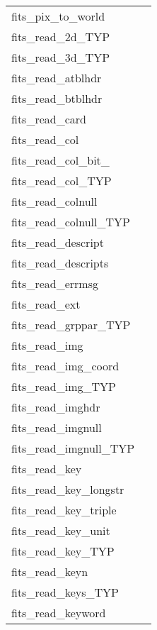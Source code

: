\documentclass[11pt]{book}
\begin{document}
\begin{tabular}{lr}
fits\_pix\_to\_world & \pageref{ffwldp} \\
fits\_read\_2d\_TYP      & \pageref{ffg2dx} \\
fits\_read\_3d\_TYP      & \pageref{ffg3dx} \\
fits\_read\_atblhdr      & \pageref{ffghtb} \\
fits\_read\_btblhdr      & \pageref{ffghbn} \\
fits\_read\_card         & \pageref{ffgcrd} \\
fits\_read\_col        & \pageref{ffgcv} \\
fits\_read\_col\_bit\_ & \pageref{ffgcx} \\
fits\_read\_col\_TYP    & \pageref{ffgcvx} \\
fits\_read\_colnull    & \pageref{ffgcf} \\
fits\_read\_colnull\_TYP    & \pageref{ffgcfx} \\
fits\_read\_descript & \pageref{ffgdes} \\
fits\_read\_descripts & \pageref{ffgdes} \\
fits\_read\_errmsg    & \pageref{ffgmsg} \\
fits\_read\_ext        & \pageref{ffgextn} \\
fits\_read\_grppar\_TYP  & \pageref{ffggpx} \\
fits\_read\_img         & \pageref{ffgpv} \\
fits\_read\_img\_coord & \pageref{ffgics} \\
fits\_read\_img\_TYP     & \pageref{ffgpvx} \\
fits\_read\_imghdr       & \pageref{ffghpr} \\
fits\_read\_imgnull & \pageref{ffgpf} \\
fits\_read\_imgnull\_TYP & \pageref{ffgpfx} \\
fits\_read\_key          & \pageref{ffgky} \\
fits\_read\_key\_longstr  & \pageref{ffgkls} \\
fits\_read\_key\_triple   & \pageref{ffgkyt} \\
fits\_read\_key\_unit     & \pageref{ffgunt} \\
fits\_read\_key\_TYP      & \pageref{ffgkyx} \\
fits\_read\_keyn         & \pageref{ffgkyn} \\
fits\_read\_keys\_TYP     & \pageref{ffgknx} \\
fits\_read\_keyword      & \pageref{ffgkey} \\

\end{tabular}
\end{document}
